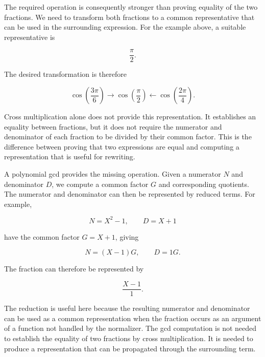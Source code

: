 \documentclass[11pt]{article}
\begin{document}
The required operation is consequently stronger than proving equality of
the two fractions. We need to transform both fractions to a common
representative that can be used in the surrounding expression. For the
example above, a suitable representative is

$$
  \frac{\pi}{2}.
$$

The desired transformation is therefore

$$
  \cos\left(\frac{3\pi}{6}\right)
  \longrightarrow
  \cos\left(\frac{\pi}{2}\right)
  \longleftarrow
  \cos\left(\frac{2\pi}{4}\right).
$$

Cross multiplication alone does not provide this representation. It
establishes an equality between fractions, but it does not require the
numerator and denominator of each fraction to be divided by their common
factor. This is the difference between proving that two expressions are
equal and computing a representation that is useful for rewriting.

A polynomial gcd provides the missing operation. Given a numerator
$N$ and denominator $D$, we compute a common factor $G$ and corresponding
quotients. The numerator and denominator can then be represented by
reduced terms. For example,

$$
  N=X^2-1,\qquad D=X+1
$$

have the common factor $G=X+1$, giving

$$
  N=(X-1)G,\qquad D=1G.
$$

The fraction can therefore be represented by

$$
  \frac{X-1}{1}.
$$

The reduction is useful here because the resulting numerator and
denominator can be used as a common representation when the fraction occurs
as an argument of a function not handled by the normalizer. The gcd computation is not needed to establish
the equality of two fractions by cross multiplication. It is needed to
produce a representation that can be propagated through the surrounding
term.


\end{document}
